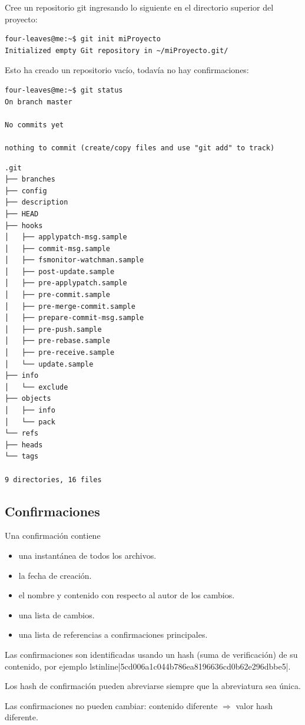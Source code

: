 Cree un repositorio git ingresando lo siguiente en el directorio superior del proyecto:
\begin{lstlisting}
four-leaves@me:~$ git init miProyecto
Initialized empty Git repository in ~/miProyecto.git/
\end{lstlisting}
Esto ha creado un repositorio vacío, todavía no hay confirmaciones:
\begin{lstlisting}
four-leaves@me:~$ git status
On branch master

No commits yet

nothing to commit (create/copy files and use "git add" to track)
\end{lstlisting}

\begin{lstlisting}
.git
├── branches
├── config
├── description
├── HEAD
├── hooks
│   ├── applypatch-msg.sample
│   ├── commit-msg.sample
│   ├── fsmonitor-watchman.sample
│   ├── post-update.sample
│   ├── pre-applypatch.sample
│   ├── pre-commit.sample
│   ├── pre-merge-commit.sample
│   ├── prepare-commit-msg.sample
│   ├── pre-push.sample
│   ├── pre-rebase.sample
│   ├── pre-receive.sample
│   └── update.sample
├── info
│   └── exclude
├── objects
│   ├── info
│   └── pack
└── refs
├── heads
└── tags

9 directories, 16 files
\end{lstlisting}

\subsection{Confirmaciones}
Una confirmación contiene
\begin{itemize}
	\item una instantánea de todos los archivos.
	\item la fecha de creación.
	\item el nombre y contenido con respecto al autor de los cambios.
	\item una lista de cambios.
	\item una lista de referencias a confirmaciones principales.
\end{itemize}
Las confirmaciones son identificadas usando un hash (suma de verificación) de su contenido, por ejemplo lstinline|5cd006a1c044b786ea8196636cd0b62e296dbbe5|.

Los hash de confirmación pueden abreviarse siempre que la abreviatura sea única.

Las confirmaciones no pueden cambiar: contenido diferente $\Rightarrow$ valor hash diferente.

